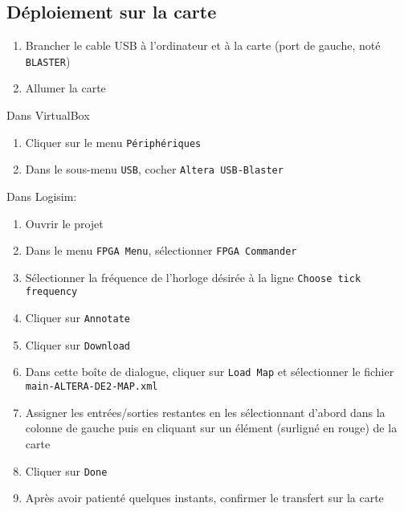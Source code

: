 \documentclass{article}
\begin{document}
    \subsection{Déploiement sur la carte}
    \begin{enumerate}
        \item Brancher le cable USB à l'ordinateur et à la carte (port de gauche, noté \texttt{BLASTER})
        \item Allumer la carte
    \end{enumerate}

    \vspace{0.2em}
    \noindent Dans VirtualBox
    \vspace{0.2em}
    \begin{enumerate}
        \item Cliquer sur le menu \texttt{Périphériques}
        \item Dans le sous-menu \texttt{USB}, cocher \texttt{Altera USB-Blaster}
    \end{enumerate}

    \noindent Dans Logisim:
    \begin{enumerate}
        \item Ouvrir le projet
        \item Dans le menu \texttt{FPGA Menu}, sélectionner \texttt{FPGA Commander}
        \item Sélectionner la fréquence de l'horloge désirée à la ligne \texttt{Choose tick frequency}
        \item Cliquer sur \texttt{Annotate}
        \item Cliquer sur \texttt{Download}
        \item Dans cette boîte de dialogue, cliquer sur \texttt{Load Map} et sélectionner le fichier \texttt{main-ALTERA-DE2-MAP.xml}
        \item Assigner les entrées/sorties restantes en les sélectionnant d'abord dans la colonne de gauche puis en cliquant sur un élément (surligné en rouge) de la carte
        \item Cliquer sur \texttt{Done}
        \item Après avoir patienté quelques instants, confirmer le transfert sur la carte
    \end{enumerate}
\end{document}
